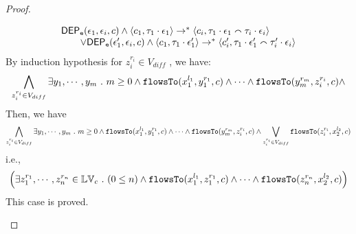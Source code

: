 \begin{proof}
\begin{case}
\begin{subcase}
\begin{subsubcase}
\begin{subsubsubcase}
\[\begin{array}{l}
  \mathsf{DEP_{\mathtt{e}}}(\mathtt{\epsilon}_1, \mathtt{\epsilon}_i, c) \land 
  \langle c_1, \mathtt{\tau}_1 \cdot \mathtt{\epsilon}_1 \rangle 
  \rightarrow^{*}
  \langle {c}_i,  \mathtt{\tau}_1 \cdot \mathtt{\epsilon}_1 \smallfrown \mathtt{\tau}_{i} \cdot \mathtt{\epsilon}_{i} \rangle
  \\ \qquad 
  \lor
  \mathsf{DEP_{\mathtt{e}}}(\mathtt{\epsilon}_1', \mathtt{\epsilon}_i, c) \land 
  \langle c_1, \mathtt{\tau}_1 \cdot \mathtt{\epsilon}_1' \rangle 
  \rightarrow^{*} 
  \langle {c}_i',  \mathtt{\tau}_1 \cdot \mathtt{\epsilon}_1' \smallfrown \mathtt{\tau}_{i}' \cdot \mathtt{\epsilon}_{i} \rangle
\end{array}
\]
%
By induction hypothesis for $z_i^{r_i} \in V_{diff}$ , we have:
\[
  \bigwedge_{z_i^{r_i} \in V_{diff}}
  \exists y_1, \cdots, y_m ~.~ 
  m \geq 0 \land
  \mathtt{flowsTo}(x_1^{l_1}, y_1^{r_1}, c) \land \cdots \land \mathtt{flowsTo}(y_m^{r_m}, z_i^{r_i}, c) \land 
\]
%
Then, we have
\[
  \bigwedge_{z_i^{r_i} \in V_{diff}}
  \exists y_1, \cdots, y_m ~.~ 
  m \geq 0 \land
  \mathtt{flowsTo}(x_1^{l_1}, y_1^{r_1}, c) \land \cdots \land \mathtt{flowsTo}(y_m^{r_m}, z_i^{r_i}, c) \land 
   \bigvee_{z_i^{r_i} \in V_{diff}}  \mathtt{flowsTo}(z_i^{r_i}, x_2^{l_2}, c)
\]
i.e.,
\[
\Big(\exists z_1^{r_1}, \cdots, z_n^{r_n} \in \mathbb{LV}_{{c}} ~.~ (0 \leq n  )
 \land \mathtt{flowsTo}(x_1^{l_1}, z_1^{r_1}, c) \land \cdots \land \mathtt{flowsTo}(z_n^{r_n}, {x}_2^{l_2}, c) \Big)
\]
This case is proved.

\end{subsubsubcase}
\end{subsubcase}
\end{subcase}
\end{case}
\end{proof}
